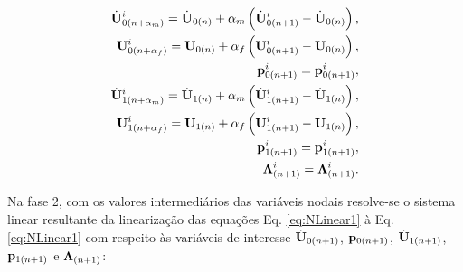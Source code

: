 \documentclass[tese_patricia]{subfiles}
\begin{document}
\begin{align}
	\dot{\mathbf{U}}_{0({n+\alpha_m})}^{i} = \dot{\mathbf{U}}_{0(n)} + \alpha_m \left( \dot{\mathbf{U}}_{0(n+1)}^{i} - \dot{\mathbf{U}}_{0(n)} \right), \label{eq:Inter1}\\
	\mathbf{U}_{0(n+\alpha_f)}^{i} = \mathbf{U}_{0(n)} + \alpha_f \left( \mathbf{U}_{0(n+1)}^{i} - \mathbf{U}_{0(n)} \right), \label{eq:Inter2}\\
	\mathbf{p}_{0(n+1)}^{i} = \mathbf{p}_{0(n+1)}^{i}, \label{eq:Inter3} \\
	\dot{\mathbf{U}}_{1(n+\alpha_m)}^{i} = \dot{\mathbf{U}}_{1(n)} + \alpha_m \left( \dot{\mathbf{U}}_{1(n+1)}^{i} - \dot{\mathbf{U}}_{1(n)} \right), \label{eq:Inter4}\\
	\mathbf{U}_{1(n+\alpha_f)}^{i} = \mathbf{U}_{1(n)} + \alpha_f \left( \mathbf{U}_{1(n+1)}^{i} - \mathbf{U}_{1(n)} \right), \label{eq:Inter5}\\
	\mathbf{p}_{1(n+1)}^{i} = \mathbf{p}_{1(n+1)}^{i},\label{eq:Inter6} \\
	\boldsymbol{\Lambda}_{(n+1)}^{i} = \boldsymbol{\Lambda}_{(n+1)}^{i}. \label{eq:Inter7}
\end{align}

Na fase 2, com os valores intermediários das variáveis nodais resolve-se o sistema linear resultante da linearização das equações Eq. \eqref{eq:NLinear1} à Eq. \eqref{eq:NLinear1} com respeito às variáveis de interesse $\dot{\mathbf{U}}_{0(n+1)}$, $\mathbf{p}_{0(n+1)}$,  $\dot{\mathbf{U}}_{1(n+1)}$, $\mathbf{p}_{1(n+1)}$ e $\boldsymbol{\Lambda}_{(n+1)}$:
\end{document}
